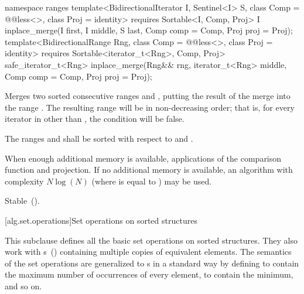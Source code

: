 \begin{addedblock}
%
\begin{itemdecl}
namespace ranges {
  template<BidirectionalIterator I, Sentinel<I> S, class Comp = @@less<>,
      class Proj = identity>
    requires Sortable<I, Comp, Proj>
    I inplace_merge(I first, I middle, S last, Comp comp = Comp{}, Proj proj = Proj{});
  template<BidirectionalRange Rng, class Comp = @@less<>, class Proj = identity>
    requires Sortable<iterator_t<Rng>, Comp, Proj>
    safe_iterator_t<Rng>
      inplace_merge(Rng&& rng, iterator_t<Rng> middle, Comp comp = Comp{},
                    Proj proj = Proj{});
}
\end{itemdecl}

\begin{itemdescr}
\pnum
\effects
Merges two sorted consecutive ranges
and
,
putting the result of the merge into the range
.
The resulting range will be in non-decreasing order;
that is, for every iterator
in
other than
,
the condition
will be false.

\pnum
\requires
The ranges  and  shall be
sorted with respect to  and .

\pnum
\returns {}

\pnum
\complexity
When enough additional memory is available,
applications of the comparison function and projection.
If no additional memory is available, an algorithm with complexity
$N \log(N)$
(where
is equal to
)
may be used.

\pnum
\remarks Stable~().
\end{itemdescr}
\end{addedblock}

[alg.set.operations]{Set operations on sorted structures}

\pnum
This subclause defines all the basic set operations on sorted structures.
They also work with
s~()
containing multiple copies of equivalent elements.
The semantics of the set operations are generalized to
s
in a standard way by defining
to contain the maximum number of occurrences of every element,
to contain the minimum, and so on.

